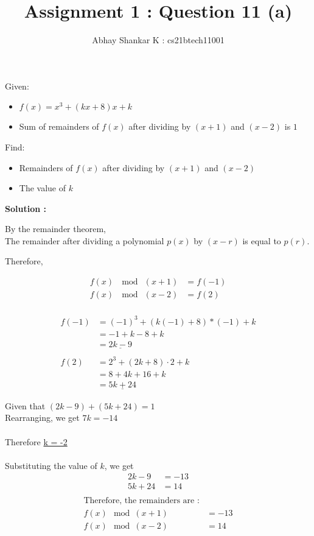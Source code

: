 \documentclass[11pt, oneside, twocolumn]{amsart}   	%
\title{Assignment 1 : Question 11 (a)}
\author{Abhay Shankar K : cs21btech11001}
\begin{document}
\maketitle
Given:
\begin{itemize}
	\item $f(x) = x^3 + (kx + 8)x + k$ 
	\item Sum of remainders of $f(x)$ after dividing by $(x + 1)$ and $(x - 2)$ is $1$
\end{itemize}
Find:
\begin{itemize}
	\item Remainders of $f(x)$ after dividing by $(x + 1)$ and $(x - 2)$
	\item The value of $k$
\end{itemize}

\textbf{Solution :}

By the remainder theorem, \\
	\quad The remainder after dividing a polynomial $p(x)$ by $(x - r)$ is equal to $p(r)$.

	 Therefore,
	 
	\begin{align*}
  		f(x)\ \mod\ (x + 1) &= f(-1) \\
  		f(x)\ \mod\ (x - 2) &= f(2) \\
	\end{align*}
	
	\begin{align*}
 		f(-1) &= (-1)^3 + (k(-1) + 8)*(-1) + k \\
		 &= -1 + k - 8 + k \\
		 &= \underline{2k - 9}  \\
		\\
		f(2) &= 2^3 + (2k + 8) \cdot 2 + k \\
		  &= 8 + 4k + 16 + k \\
		 &= \underline{5k + 24}
	\end{align*}
		  
Given that $(2k - 9) + (5k + 24) = 1$
	\\	
Rearranging, we get $7k = -14$ \\
		\\
Therefore \underline{k = -2}\\
		\\
Substituting the value of $k$, we get
	\begin{align*}
		2k - 9 &= -13 \\
		5k + 24 &= 14 \\
\end{align*}
\begin{align*}
\text{Therefore, the remainders are :}
 \\
	f(x) \mod (x + 1) &= -13 \\
	f(x) \mod (x - 2) &= 14 \\
		\end{align*}
\\
\end{document}
